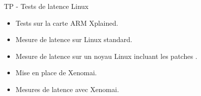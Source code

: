 \documentclass[a4paper,12pt,obeyspaces,spaces,hyphens]{article}
\begin{document}
\feagendaonecolumn
{TP - Tests de latence Linux}
{
  \begin{itemize}
  \item Tests sur la carte ARM Xplained.
  \item Mesure de latence sur Linux standard.
  \item Mesure de latence sur un noyau Linux
	incluant les patches .
  \item Mise en place de Xenomai.
  \item Mesures de latence avec Xenomai.
  \end{itemize}
}
\end{document}
